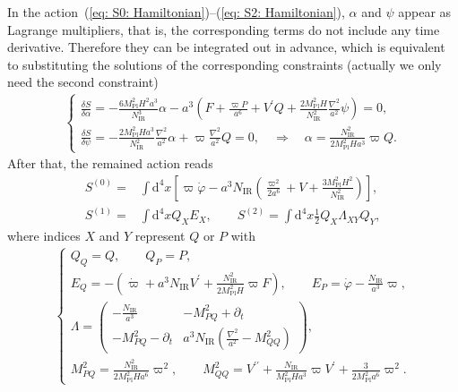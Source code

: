 \documentclass[aps, prd
, preprint
, nofootinbib 
]{revtex4-1}
\newcommand{\var}[2]{\frac{\delta #1}{\delta #2}}
\newcommand{\dd}{\mathrm{d}}
\newcommand{\Mpl}{M_\text{Pl}}
\newcommand{\IR}{\text{IR}}
\newcommand{\dps}{\displaystyle}
\newcommand{\bae}[1]{\begin{align} #1 \end{align}}
\newcommand{\bce}[1]{\begin{cases} #1 \end{cases}}
\newcommand{\bpme}[1]{\begin{pmatrix} #1 \end{pmatrix}}
\begin{document}
In the action~(\ref{eq: S0: Hamiltonian})--(\ref{eq: S2: Hamiltonian}), $\alpha$ and $\psi$ appear as Lagrange multipliers, that is,
the corresponding terms do not include any time derivative. Therefore they can be integrated out in advance, which is equivalent to
substituting the solutions of the corresponding constraints (actually we only need the second constraint)
\bae{
	\bce{
		\dps
		\var{S}{\alpha}=-\frac{6\Mpl^2H^2a^3}{N_\IR^3}\alpha-a^3\left(F+\frac{\varpi P}{a^6}+V^\prime Q
		+\frac{2\Mpl^2H}{N_\IR^2}\frac{\nabla^2}{a^2}\psi\right)=0, \\[10pt]
		\dps
		\var{S}{\psi}=-\frac{2\Mpl^2Ha^3}{N_\IR^2}\frac{\nabla^2}{a^2}\alpha+\varpi\frac{\nabla^2}{a^2}Q=0,
		\quad \Rightarrow \quad \alpha=\frac{N_\IR^2}{2\Mpl^2Ha^3}\varpi Q.
	}
}
After that, the remained action reads
\bae{
	S^{(0)}=&\int\dd^4x\left[\varpi\dot{\varphi}-a^3N_\IR\left(\frac{\varpi^2}{2a^6}+V+\frac{3\Mpl^2H^2}{N_\IR^2}\right)\right], \\
	S^{(1)}=&\int\dd^4xQ_XE_X, \quad\quad S^{(2)}=\int\dd^4x\frac{1}{2}Q_X\Lambda_{XY}Q_Y,
}
where indices $X$ and $Y$ represent $Q$ or $P$ with
\bae{
	\bce{
		\dps
		Q_Q=Q, \quad\quad Q_P=P, \\[10pt]
		\dps
		E_Q=-\left(\dot{\varpi}+a^3N_\IR V^\prime+\frac{N_\IR^2}{2\Mpl^2H}\varpi F\right), \quad\quad
		E_P=\dot{\varphi}-\frac{N_\IR}{a^3}\varpi, \\[10pt]
		\dps
		\Lambda=
		\bpme{
			-\frac{N_\IR}{a^3} & -M_{PQ}^2+\partial_t \\
			-M_{PQ}^2-\partial_t & a^3N_\IR\left(\frac{\nabla^2}{a^2}-M_{QQ}^2\right)
		}, \\[10pt]
		\dps
		M_{PQ}^2=\frac{N_\IR^2}{2\Mpl^2Ha^6}\varpi^2, \quad\quad 
		M_{QQ}^2=V^{\prime\prime}+\frac{N_\IR}{\Mpl^2Ha^3}\varpi V^\prime+\frac{3}{2\Mpl^2a^6}\varpi^2.
	}
}
\end{document}

